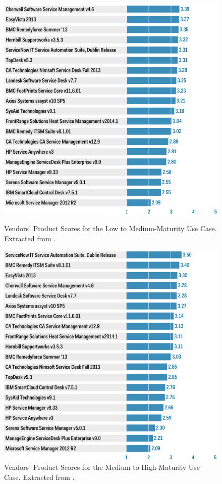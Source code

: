 \begin{figure}[!h]
\begin{minipage}[!htb]{0.42\linewidth}
\centering
\includegraphics[width=\textwidth]{img/LowMediumScores.png}
\caption{Vendors' Product Scores for the Low to Medium-Maturity Use Case. Extracted from \cite{criticalCapabilitiesITSM}.}
\label{fig:figure1}
\end{minipage}
\hspace{0.5cm}
\begin{minipage}[!h]{0.42\linewidth}
\centering
\includegraphics[width=\textwidth]{img/MediumHighScores.png}
\caption{Vendors' Product Scores for the Medium to High-Maturity Use Case. Extracted from \cite{criticalCapabilitiesITSM}.}
\label{fig:figure2}
\end{minipage}
\end{figure}

